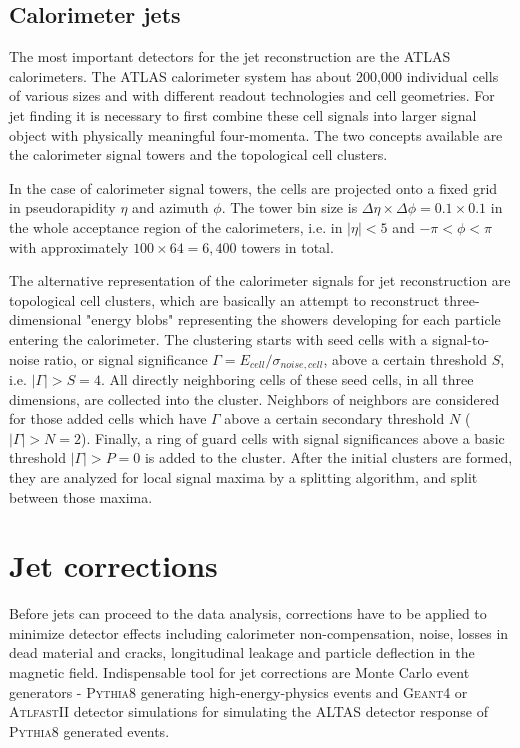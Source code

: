 \subsection{Calorimeter jets}
\label{sse:CalorimeterJets}

The most important detectors for the jet reconstruction are the ATLAS calorimeters.
The ATLAS calorimeter system has about 200,000 individual cells of various sizes
and with different readout technologies and cell geometries. For jet finding it
is necessary to first combine these cell signals into larger signal object with
physically meaningful four-momenta. The two concepts available are the calorimeter
signal towers and the topological cell clusters.

In the case of calorimeter signal towers, the cells are projected onto a fixed
grid in pseudorapidity $\eta$ and azimuth $\phi$. The tower bin size is $\Delta
\eta \times \Delta \phi = 0.1 \times 0.1$ in the whole acceptance region of the
calorimeters, i.e. in $|\eta| < 5$ and $- \pi < \phi < \pi$ with approximately 
$100 \times 64 = 6,400$ towers in total.

The alternative representation of the calorimeter signals for jet
reconstruction are topological cell clusters, which are basically an attempt to
reconstruct three-dimensional "energy blobs" representing the showers developing
for each particle entering the calorimeter. The clustering starts with seed
cells with a signal-to-noise ratio, or signal significance $\Gamma = E_{cell} /
\sigma_{noise,cell}$, above a certain threshold $S$, i.e. $|\Gamma| > S = 4$.
All directly neighboring cells of these seed cells, in all three dimensions,
are collected into the cluster. Neighbors of neighbors are considered for
those added cells which have $\Gamma$ above a certain secondary threshold $N$
($|\Gamma| > N = 2$). Finally, a ring of guard cells with signal significances
above a basic threshold $|\Gamma| > P = 0$ is added to the cluster. After the
initial clusters are formed, they are analyzed for local signal maxima by a
splitting algorithm, and split between those maxima.

\section{Jet corrections}

Before jets can proceed to the data analysis, corrections have to be applied to
minimize detector effects including calorimeter non-compensation, noise, losses
in dead material and cracks, longitudinal leakage and particle deflection in the
magnetic field. Indispensable tool for jet corrections are Monte Carlo event
generators - \textsc{Pythia8} \cite{Pythia8} generating high-energy-physics
events and \textsc{Geant4} \cite{Geant4} or \textsc{AtlfastII} \cite{AtlfastII}
detector simulations for simulating the ALTAS detector response of
\textsc{Pythia8} generated events.

